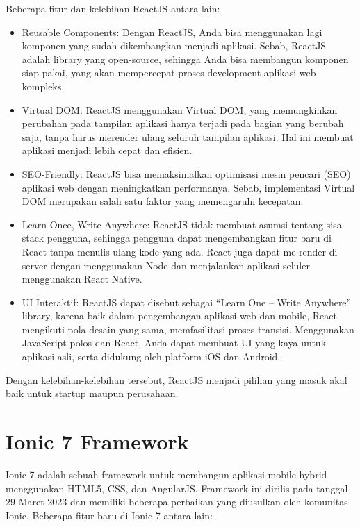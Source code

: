Beberapa fitur dan kelebihan ReactJS antara lain:

\begin{itemize}
    \item Reusable Components: Dengan ReactJS, Anda bisa menggunakan lagi komponen yang sudah dikembangkan menjadi aplikasi. Sebab, ReactJS adalah library yang open-source, sehingga Anda bisa membangun komponen siap pakai, yang akan mempercepat proses development aplikasi web kompleks.
    \item Virtual DOM: ReactJS menggunakan Virtual DOM, yang memungkinkan perubahan pada tampilan aplikasi hanya terjadi pada bagian yang berubah saja, tanpa harus merender ulang seluruh tampilan aplikasi. Hal ini membuat aplikasi menjadi lebih cepat dan efisien.
    \item SEO-Friendly: ReactJS bisa memaksimalkan optimisasi mesin pencari (SEO) aplikasi web dengan meningkatkan performanya. Sebab, implementasi Virtual DOM merupakan salah satu faktor yang memengaruhi kecepatan.
    \item Learn Once, Write Anywhere: ReactJS tidak membuat asumsi tentang sisa stack pengguna, sehingga pengguna dapat mengembangkan fitur baru di React tanpa menulis ulang kode yang ada. React juga dapat me-render di server dengan menggunakan Node dan menjalankan aplikasi seluler menggunakan React Native.
    \item UI Interaktif: ReactJS dapat disebut sebagai “Learn One – Write Anywhere” library, karena baik dalam pengembangan aplikasi web dan mobile, React mengikuti pola desain yang sama, memfasilitasi proses transisi. Menggunakan JavaScript polos dan React, Anda dapat membuat UI yang kaya untuk aplikasi asli, serta didukung oleh platform iOS dan Android. 
\end{itemize}

Dengan kelebihan-kelebihan tersebut, ReactJS menjadi pilihan yang masuk akal baik untuk startup maupun perusahaan.

\section{Ionic 7 Framework}
\label{sec:template}
 
 

Ionic 7 adalah sebuah framework untuk membangun aplikasi mobile hybrid menggunakan HTML5, CSS, dan AngularJS. Framework ini dirilis pada tanggal 29 Maret 2023 dan memiliki beberapa perbaikan yang diusulkan oleh komunitas Ionic. Beberapa fitur baru di Ionic 7 antara lain:

